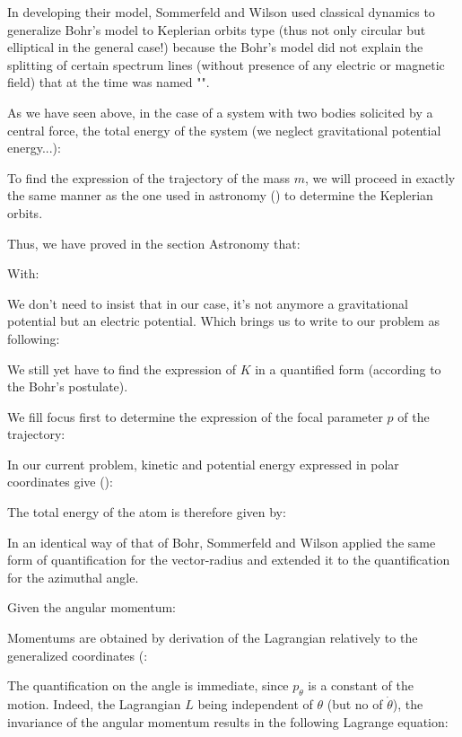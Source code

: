 	In developing their model, Sommerfeld and Wilson used classical dynamics to generalize Bohr's model to Keplerian orbits type (thus not only circular but elliptical in the general case!) because the Bohr's model did not explain the splitting of certain spectrum lines (without presence of any electric or magnetic field) that at the time was named "".
	
	As we have seen above, in the case of a system with two bodies solicited by a central force, the total energy of the system (we neglect gravitational potential energy...):
	
	To find the expression of the trajectory of the mass $m$, we will proceed in exactly the same manner as the one used in astronomy () to determine the Keplerian orbits.
	
	Thus, we have proved in the section Astronomy that:
	
	With:
	
	We don't need to insist that in our case, it's not anymore a gravitational potential but an electric potential. Which brings us to write to our problem as following:
	
	We still yet have to find the expression of $K$ in a quantified form (according to the Bohr's postulate).
	
	We fill focus first to determine the expression of the focal parameter $p$ of the trajectory:
	
	In our current problem, kinetic and potential energy expressed in polar coordinates give ():
	
	The total energy of the atom is therefore given by:
	
	In an identical way of that of Bohr, Sommerfeld and Wilson applied the same form of quantification for the vector-radius and extended it to the quantification for the azimuthal angle.
	
	Given the angular momentum:
	
	Momentums are obtained by derivation of the Lagrangian relatively to the generalized coordinates (:
	
	The quantification on the angle is immediate, since $p_\theta$ is a constant of the motion. Indeed, the Lagrangian $L$ being independent of $\theta$ (but no of $\dot{\theta}$), the invariance of the angular momentum results in the following Lagrange equation:
	
